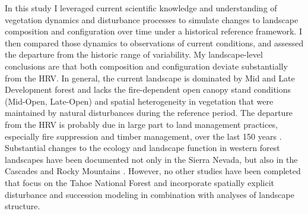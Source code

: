 

In this study I leveraged current scientific knowledge and understanding of vegetation dynamics and disturbance processes to simulate changes to landscape composition and configuration over time under a historical reference framework. I then compared those dynamics to observations of current conditions, and assessed the departure from the historic range of variability. My landscape-level conclusions are that both composition and configuration deviate substantially from the HRV. In general, the current landscape is dominated by Mid and Late Development forest and lacks the fire-dependent open canopy stand conditions (Mid-Open, Late-Open) and spatial heterogeneity in vegetation that were maintained by natural disturbances during the reference period. The departure from the HRV is probably due in large part to land management practices, especially fire suppression and timber management, over the last 150 years \citep{Safford2014,Stephens2007}. Substantial changes to the ecology and landscape function in western forest landscapes have been documented not only in the Sierra Nevada, but also in the Cascades and Rocky Mountains \citep{Hessburg2005,Baker2012,Baker2014,Mallek2013,Agee1993}. However, no other studies have been completed that focus on the Tahoe National Forest and incorporate spatially explicit disturbance and succession modeling in combination with analyses of landscape structure.

